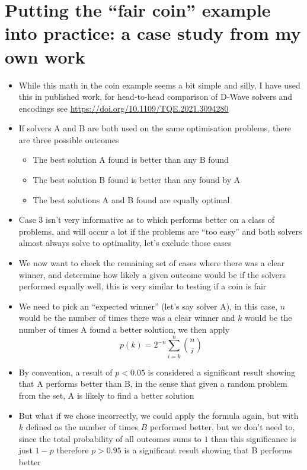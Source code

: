 \documentclass[english]{article}
\begin{document}
\section{Putting the ``fair coin'' example into practice: a case study from my own work}
\begin{itemize}
\item While this math in the coin example seems a bit simple and silly, I have used this in published work, for head-to-head comparison of D-Wave solvers and encodings see \href{https://doi.org/10.1109/TQE.2021.3094280}{https://doi.org/10.1109/TQE.2021.3094280}
\item If solvers A and B are both used on the same optimisation problems, there are three possible outcomes
\begin{itemize}
\item The best solution A found is better than any B found
\item The best solution B found is better than any found by A
\item The best solutions A and B found are equally optimal
\end{itemize}
\item Case 3 isn't very informative as to which performs better on a class of problems, and will occur a lot if the problems are ``too easy'' and both solvers almost always solve to optimality, let's exclude those cases
\item We now want to check the remaining set of cases where there was a clear winner, and determine how likely a given outcome would be if the solvers performed equally well, this is very similar to testing if a coin is fair
\item We need to pick an ``expected winner'' (let's say solver A), in this case, $n$ would be the number of times there was a clear winner and $k$ would be the number of times A found a better solution, we then apply 
\begin{equation}
p(k)=2^{-n}\sum^n_{i=k}\binom{n}{i}
\end{equation}
\item By convention, a result of $p<0.05$ is considered a significant result showing that A performs better than B, in the sense that given a random problem from the set, A is likely to find a better solution
\item But what if we chose incorrectly, we could apply the formula again, but with $k$ defined as the number of times $B$ performed better, but we don't need to, since the total probability of all outcomes sums to $1$ than this significance is just $1-p$ therefore $p>0.95$ is a significant result showing that B performs better

\end{itemize}
\end{document}
